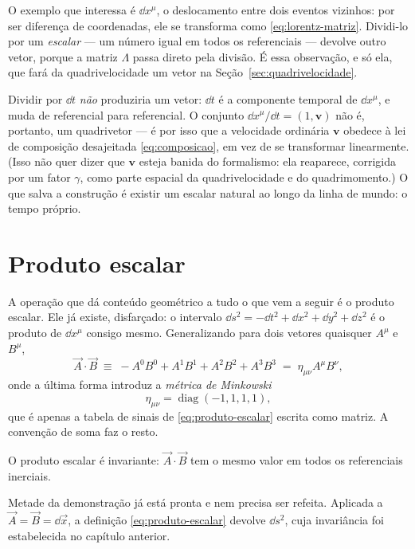 \documentclass[12pt,a4paper,oneside]{book}
\theoremstyle{rgplain}
\theoremstyle{rgremark}
\begin{document}
O exemplo que interessa é $\dd x^\mu$, o deslocamento entre dois eventos
vizinhos: por ser diferença de coordenadas, ele se transforma como
\eqref{eq:lorentz-matriz}. Dividi-lo por um \emph{escalar} --- um número igual
em todos os referenciais --- devolve outro vetor, porque a matriz $\Lambda$
passa direto pela divisão. É essa observação, e só ela, que fará da
quadrivelocidade um vetor na Seção~\ref{sec:quadrivelocidade}.

\begin{atencao}
Dividir por $\dd t$ \emph{não} produziria um vetor: $\dd t$ é a componente
temporal de $\dd x^\mu$, e muda de referencial para referencial. O conjunto
$\dd x^\mu/\dd t=(1,\bm v)$ não é, portanto, um quadrivetor --- é por isso que
a velocidade ordinária $\bm v$ obedece à lei de composição desajeitada
\eqref{eq:composicao}, em vez de se transformar linearmente. (Isso não quer
dizer que $\bm v$ esteja banida do formalismo: ela reaparece, corrigida por um
fator $\gamma$, como parte espacial da quadrivelocidade e do quadrimomento.) O que salva a
construção é existir um escalar natural ao longo da linha de mundo: o tempo
próprio.
\end{atencao}

\section{Produto escalar}
\label{sec:produto-escalar}

A operação que dá conteúdo geométrico a tudo o que vem a seguir é o produto
escalar. Ele já existe, disfarçado: o intervalo
$\dd s^2=-\dd t^2+\dd x^2+\dd y^2+\dd z^2$ é o produto de $\dd x^\mu$ consigo
mesmo. Generalizando para dois vetores quaisquer $A^\mu$ e $B^\mu$,
\begin{equation}
  \vec A\cdot\vec B\;\equiv\;-A^0B^0+A^1B^1+A^2B^2+A^3B^3
  \;=\;\eta_{\mu\nu}A^\mu B^\nu ,
  \label{eq:produto-escalar}
\end{equation}
onde a última forma introduz a \emph{métrica de Minkowski}
\[
  \eta_{\mu\nu}=\operatorname{diag}(-1,1,1,1),
\]
que é apenas a tabela de sinais de \eqref{eq:produto-escalar} escrita como
matriz. A convenção de soma faz o resto.

\begin{resultado}
O produto escalar é invariante: $\vec A\cdot\vec B$ tem o mesmo valor em todos
os referenciais inerciais.
\end{resultado}

Metade da demonstração já está pronta e nem precisa ser refeita. Aplicada a
$\vec A=\vec B=\dd\vec x$, a definição \eqref{eq:produto-escalar} devolve
$\dd s^2$, cuja invariância foi estabelecida no capítulo anterior.
\end{document}
